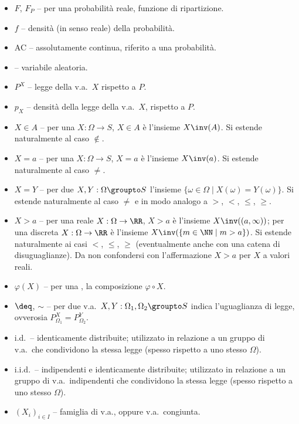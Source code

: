 \begin{multicols*}{2}
\begin{itemize}
        \item $F$, $F_P$ -- per una probabilità reale, funzione di ripartizione.
        \item $f$ -- densità (in senso reale) della probabilità.
        \item AC -- assolutamente continua, riferito a una probabilità.
        \item \va -- variabile aleatoria.
        \item $P^X$ -- legge della v.a.~$X$ rispetto a $P$.
        \item $p_X$ -- densità della legge della v.a.~$X$, rispetto a $P$.
        \item $X \in A$ -- per una \va $X : \Omega \to S$,
        $X \in A$ è l'insieme $X\inv(A)$. Si estende naturalmente
        al caso $\notin$.
        \item $X = a$ -- per una \va $X : \Omega \to S$,
        $X = a$ è l'insieme $X\inv(a)$. Si estende naturalmente
        al caso $\neq$.
        \item $X = Y$ -- per due \va $X, Y : \Omega \groupto S$
        l'insieme $\{ \omega \in \Omega \mid X(\omega) = Y(\omega) \}$.
        Si estende naturalmente al caso $\neq$ e in modo analogo a $>$, $<$, $\leq$, $\geq$.
        \item $X > a$ -- per una \va reale $X : \Omega \to \RR$,
        $X > a$ è l'insieme $X\inv((a, \infty))$; per una \va discreta
        $X : \Omega \to \RR$ è l'insieme $X\inv(\{m \in \NN \mid m > a\})$.
        Si estende naturalmente ai casi $<$, $\leq$, $\geq$ (eventualmente
        anche con una catena di disuguaglianze). Da non confondersi con
        l'affermazione $X > a$ per $X$ a valori reali.
        \item $\varphi(X)$ -- per una \va, la composizione $\varphi \circ X$.
        \item $\deq$, $\sim$ -- per due v.a.~$X, Y : \Omega_1, \Omega_2 \groupto S$
        indica l'uguaglianza di legge, ovverosia $P_{\Omega_1}^X = P_{\Omega_2}^Y$.
        \item i.d.~-- identicamente distribuite; utilizzato in relazione a un gruppo
        di v.a.~che condividono la stessa legge (spesso rispetto a uno stesso $\Omega$).
        \item i.i.d.~-- indipendenti e identicamente distribuite; utilizzato in relazione
        a un gruppo di v.a.~indipendenti che condividono la stessa legge (spesso rispetto
        a uno stesso $\Omega$).
        \item $(X_i)_{i \in I}$ -- famiglia di v.a., oppure v.a.~congiunta.

\end{itemize}
\end{multicols*}
